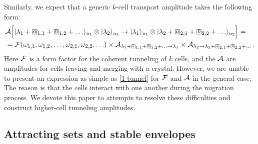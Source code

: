 \documentclass[10pt]{article}
\theoremstyle{definition}
\def\CA{{\cal A}}
\def\CF {{\cal F}}
\numberwithin{equation}{section}
\newcommand\sqbox[1]{{
		\setbox0=\hbox{\mbox{$\Box$}}
		\setbox1=\hbox{\mbox{\raisebox{0.35ex}{\small #1}}}
		\mbox{\raisebox{-0.2ex}{\rlap{\hbox to \wd0{\hss{\box1}\hss}}\box0}}
}}
\newcommand\ssqbox[1]{{
		\setbox0=\hbox{\mbox{$\scriptstyle\Box$}}
		\setbox1=\hbox{\mbox{\raisebox{0.35ex}{\tiny #1}}}
		\mbox{\raisebox{-0.2ex}{\rlap{\hbox to \wd0{\hss{\box1}\hss}}\box0}}
}}
\begin{document}
Similarly, we expect that a generic $k$-cell transport amplitude takes the following form:
\begin{equation}\label{form-factor}
	\begin{aligned}
	&\CA\Big[|\lambda_1+\sqbox{$a$}_{1,1}+\sqbox{$b$}_{1,2}+\ldots\rangle_{u_1}\otimes |\lambda_2\rangle_{u_2}\to|\lambda_1\rangle_{u_1}\otimes |\lambda_2+\sqbox{$a$}_{2,1}+\sqbox{$b$}_{2,2}+\ldots\rangle_{u_2}\Big]=\\
	&=\CF(\omega_{1,1},\omega_{1,2},\ldots,\omega_{2,1},\omega_{2,2},\ldots)\times\CA_{\lambda_1+\ssqbox{$a$}_{1,1}+\ssqbox{$b$}_{1,2}+\ldots\to\lambda_1}\times\CA_{\lambda_2\to\lambda_2+\ssqbox{$a$}_{2,1}+\ssqbox{$b$}_{2,2}+\ldots}\,.
	\end{aligned}
\end{equation}
Here $\CF$ is a form factor for the coherent tunneling of $k$ cells, and the $\CA$ are amplitudes for cells leaving and merging with a crystal.
However, we are unable to present an expression as simple as \eqref{1-tunnel} for $\CF$ and $\CA$ in the general case.
The reason is that the cells interact with one another during the migration process.
We devote this paper to attempts to resolve these difficulties and construct higher-cell tunneling amplitudes.




\subsection{Attracting sets and stable envelopes}\label{sec:stab}
\end{document}
